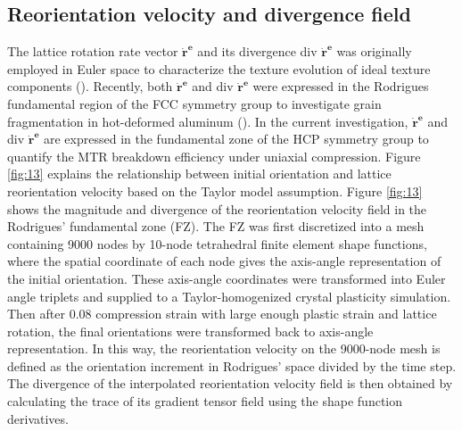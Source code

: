 \documentclass[review]{elsarticle}
\begin{document}
\subsection{Reorientation velocity and divergence field}
\label{discussion1}
The lattice rotation rate vector $\mathbf{\dot{r}^e}$ and its divergence div $\mathbf{\dot{r}^e}$ was originally employed in Euler space to characterize the texture evolution of ideal texture components (\cite{Toth}).
Recently, both $\mathbf{\dot{r}^e}$ and div $\mathbf{\dot{r}^e}$ were expressed in the Rodrigues fundamental region of the FCC symmetry group to investigate grain fragmentation in hot-deformed aluminum (\cite{r32}).
In the current investigation, $\mathbf{\dot{r}^e}$ and div $\mathbf{\dot{r}^e}$ are expressed in the fundamental zone of the HCP symmetry group to quantify the MTR breakdown efficiency under uniaxial compression.
Figure \ref{fig:13} explains the relationship between initial orientation and lattice reorientation velocity based on the Taylor model assumption.
Figure \ref{fig:13} shows the magnitude and divergence of the reorientation velocity field in the Rodrigues' fundamental zone (FZ).
The FZ was first discretized into a mesh containing 9000 nodes by 10-node tetrahedral finite element shape functions, where the spatial coordinate of each node gives the axis-angle representation of the initial orientation.
These axis-angle coordinates were transformed into Euler angle triplets and supplied to a Taylor-homogenized crystal plasticity simulation.
Then after 0.08 compression strain with large enough plastic strain and lattice rotation, the final orientations were transformed back to axis-angle representation.
In this way, the reorientation velocity on the 9000-node mesh is defined as the orientation increment in Rodrigues' space divided by the time step.
The divergence of the interpolated reorientation velocity field is then obtained by calculating the trace of its gradient tensor field using the shape function derivatives.
\end{document}
